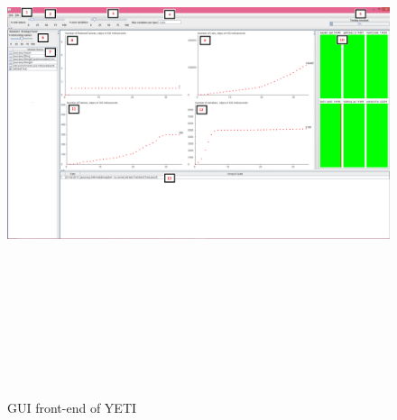 \begin{figure}
\centering
\centerline{\includegraphics[width=23cm,height=16cm]{chapter3/yetiGUI.png}}
\caption{GUI front-end of YETI}
\label{fig:yetiGUI_3}
\end{figure}



